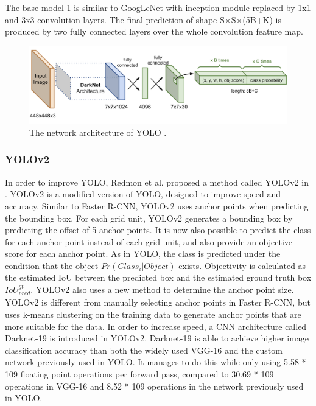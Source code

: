 The base model \ref{fig:yolo-network} is similar to GoogLeNet with inception module replaced by 1x1 and 3x3 convolution layers. The final prediction of shape S×S×(5B+K) is produced by two fully connected layers over the whole convolution feature map.
\begin{figure}[ht!]
	\centerline{\includegraphics[width=1\linewidth]{Figs/yolo-network.png}}
	\caption{The network architecture of YOLO \cite{DBLP:journals/corr/RedmonDGF15}.}
	\label{fig:yolo-network}
\end{figure}
\subsubsection{YOLOv2}
In order to improve YOLO, Redmon et al. proposed a method called YOLOv2 in \cite{DBLP:journals/corr/RedmonF16}. YOLOv2 is a modified version of YOLO, designed to improve speed and accuracy.
Similar to Faster R-CNN, YOLOv2 uses anchor points when predicting the bounding box. For each grid unit, YOLOv2 generates a bounding box by predicting the offset of 5 anchor points. It is now also possible to predict the class for each anchor point instead of each grid unit, and also provide an objective score for each anchor point. As in YOLO, the class is predicted under the condition that the object \(Pr(Class_i|Object)\) exists. Objectivity is calculated as the estimated IoU between the predicted box and the estimated ground truth box \(IoU_{pred}^{gt}\). YOLOv2 also uses a new method to determine the anchor point size. YOLOv2 is different from manually selecting anchor points in Faster R-CNN, but uses k-means clustering on the training data to generate anchor points that are more suitable for the data.
In order to increase speed, a CNN architecture called Darknet-19 is introduced in YOLOv2. Darknet-19 is able to achieve higher image classification accuracy than both the widely used VGG-16 and the custom network previously used in YOLO. It manages to do this while only using 5.58 * 109 floating point operations per forward pass, compared to 30.69 * 109 operations in VGG-16 and 8.52 * 109 operations in the network previously used in YOLO.
